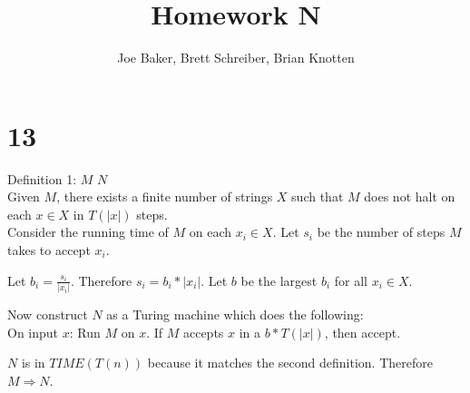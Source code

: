 \documentclass[letterpaper,notitlepage,twoside]{article}
\renewcommand{\implies}{\Rightarrow} %
\begin{document}
\title{Homework N}
\author{Joe Baker, Brett Schreiber, Brian Knotten}
\maketitle

\section*{13}
Definition 1: $M$ \implies $N$ \\

Given $M$, there exists a finite number of strings $X$ such that $M$ does not halt on each $x \in X$ in $T(|x|)$ steps. \\

Consider the running time of $M$ on each $x_i \in X$. Let $s_i$ be the number of steps $M$ takes to accept $x_i$.

Let $b_i = \frac{s_i}{|x_i|}$. Therefore $s_i = b_i * |x_i|$.
Let $b$ be the largest $b_i$ for all $x_i \in X$.

Now construct $N$ as a Turing machine which does the following: \\
On input $x$:
	Run $M$ on $x$.
	If $M$ accepts $x$ in a $b * T(|x|)$, then accept.

$N$ is in $TIME(T(n))$ because it matches the second definition. Therefore $M \implies N$.
\end{document}
